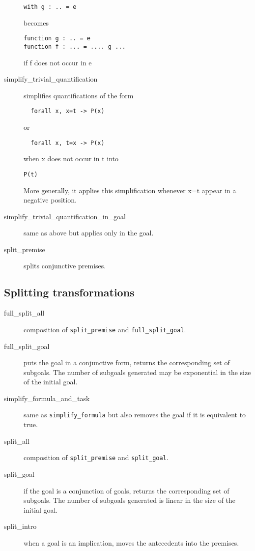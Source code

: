 \begin{description}
\begin{verbatim}
with g : .. = e
\end{verbatim}
becomes
\begin{verbatim}
function g : .. = e
function f : ... = .... g ...
\end{verbatim}
if f does not occur in e

\item[simplify\_trivial\_quantification]
  simplifies quantifications of the form
\begin{verbatim}
  forall x, x=t -> P(x)
\end{verbatim}
or
\begin{verbatim}
  forall x, t=x -> P(x)
\end{verbatim}
  when x does not occur in t
  into
\begin{verbatim}
P(t)
\end{verbatim}
  More generally, it applies this simplification whenever x=t appear
  in a negative position.

\item[simplify\_trivial\_quantification\_in\_goal]
  same as above but applies only in the goal.

\item[split\_premise]
  splits conjunctive premises.

\end{description}

\subsection{Splitting transformations}

\begin{description}

\item[full\_split\_all]
  composition of \texttt{split\_premise} and \texttt{full\_split\_goal}.

\item[full\_split\_goal] puts the goal in a conjunctive form,
  returns the corresponding set of subgoals. The number of subgoals
  generated may be exponential in the size of the initial goal.

\item[simplify\_formula\_and\_task] same as \texttt{simplify\_formula}
  but also removes the goal if it is equivalent to true.

\item[split\_all]
  composition of \texttt{split\_premise} and \texttt{split\_goal}.

\item[split\_goal] if the goal is a conjunction of goals, returns the
  corresponding set of subgoals. The number of subgoals generated is linear in
  the size of the initial goal.

\item[split\_intro]
  when a goal is an implication, moves the antecedents into the premises.

\end{description}



